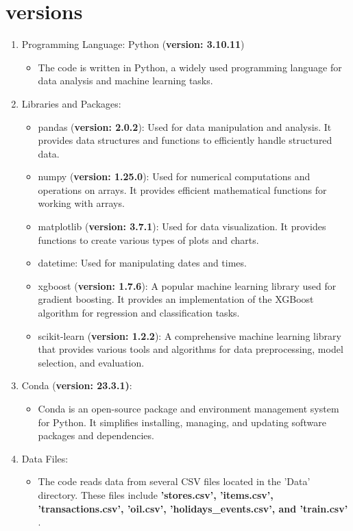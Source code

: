 \section{versions}

\begin{enumerate}
	\item Programming Language: Python (\textbf{version: 3.10.11})
	\begin{itemize}
		\item The code is written in Python, a widely used programming language for data analysis and machine learning tasks.
	\end{itemize}
	\item Libraries and Packages:
	\begin{itemize}
		\item pandas (\textbf{version: 2.0.2}): Used for data manipulation and analysis. It provides data structures and functions to efficiently handle structured data.
		\item numpy (\textbf{version: 1.25.0}): Used for numerical computations and operations on arrays. It provides efficient mathematical functions for working with arrays.
		\item matplotlib (\textbf{version: 3.7.1}): Used for data visualization. It provides functions to create various types of plots and charts.
		\item datetime: Used for manipulating dates and times.
		\item xgboost (\textbf{version: 1.7.6}): A popular machine learning library used for gradient boosting. It provides an implementation of the XGBoost algorithm for regression and classification tasks.
		\item scikit-learn (\textbf{version: 1.2.2}): A comprehensive machine learning library that provides various tools and algorithms for data preprocessing, model selection, and evaluation.
	\end{itemize}
	\item Conda (\textbf{version: 23.3.1)}:
	\begin{itemize}
		\item Conda is an open-source package and environment management system for Python. It simplifies installing, managing, and updating software packages and dependencies.
	\end{itemize}
	\item Data Files:
	\begin{itemize}
		\item The code reads data from several CSV files located in the 'Data' directory. These files include \textbf{'stores.csv', 'items.csv', 'transactions.csv', 'oil.csv', 'holidays\_events.csv', and 'train.csv'} .
	\end{itemize}
\end{enumerate}

